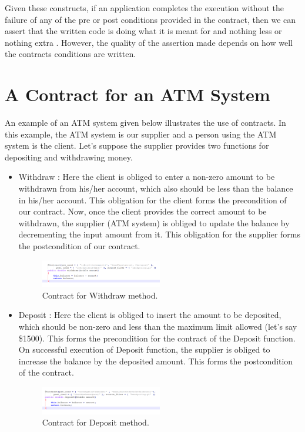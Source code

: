 Given these constructs, if an application completes the execution without the failure of any of the pre or post conditions provided in the contract, then we can assert that the written code is doing what it is meant for and nothing less or nothing extra \cite{DesignByContractByExample}.
However, the quality of the assertion made depends on how well the contracts conditions are written. 

\section{A Contract for an ATM System}

An example of an ATM system given below illustrates the use of contracts.
In this example, the ATM system is our supplier and a person using the ATM system is the client. Let's suppose the supplier provides two functions for depositing and withdrawing money.
\begin{itemize}
\item Withdraw :
Here the client is obliged to enter a non-zero amount to be withdrawn from his/her account, which also should be less than the balance in his/her account. This obligation for the client forms the precondition of our contract.
Now, once the client provides the correct amount to be withdrawn, the supplier (ATM system) is obliged to update the balance by decrementing the input amount from it. This obligation for the supplier forms the postcondition of our contract.
\linebreak
\begin{figure}[htb]
\centering
\includegraphics[width=0.5\textwidth]{images/WithdrawContractExample.PNG}
\caption{Contract for Withdraw method.} 
\label{fig:WithdrawContract}
\end{figure}

\newpage

\item Deposit :
Here the client is obliged to insert the amount to be deposited, which should be non-zero and less than the maximum limit allowed (let's say \$1500). This forms the precondition for the contract of the Deposit function.
On successful execution of Deposit function, the supplier is obliged to increase the balance by the deposited amount. This forms the postcondition of the contract.
\linebreak
\begin{figure}[htb]
\centering
\includegraphics[width=0.5\textwidth]{images/DepositContract.PNG}
\caption{Contract for Deposit method.} 
\label{fig:DepositContract}
\end{figure}  
      
\end{itemize}


